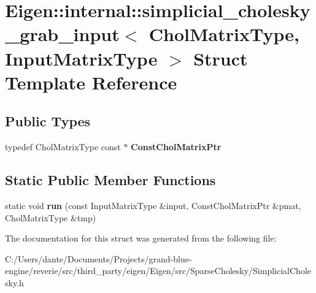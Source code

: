 \hypertarget{struct_eigen_1_1internal_1_1simplicial__cholesky__grab__input}{}\section{Eigen\+::internal\+::simplicial\+\_\+cholesky\+\_\+grab\+\_\+input$<$ Chol\+Matrix\+Type, Input\+Matrix\+Type $>$ Struct Template Reference}
\label{struct_eigen_1_1internal_1_1simplicial__cholesky__grab__input}
\subsection*{Public Types}
\begin{DoxyCompactItemize}
\item 
\mbox{\label{struct_eigen_1_1internal_1_1simplicial__cholesky__grab__input_aa40b82ddba001795c47760775a5ed4a5}} 
typedef Chol\+Matrix\+Type const  $\ast$ {\bfseries Const\+Chol\+Matrix\+Ptr}
\end{DoxyCompactItemize}
\subsection*{Static Public Member Functions}
\begin{DoxyCompactItemize}
\item 
\mbox{\label{struct_eigen_1_1internal_1_1simplicial__cholesky__grab__input_ad2473ac42c6e41b5eb5383be03740c05}} 
static void {\bfseries run} (const Input\+Matrix\+Type \&input, Const\+Chol\+Matrix\+Ptr \&pmat, Chol\+Matrix\+Type \&tmp)
\end{DoxyCompactItemize}


The documentation for this struct was generated from the following file\+:\begin{DoxyCompactItemize}
\item 
C\+:/\+Users/dante/\+Documents/\+Projects/grand-\/blue-\/engine/reverie/src/third\+\_\+party/eigen/\+Eigen/src/\+Sparse\+Cholesky/Simplicial\+Cholesky.\+h\end{DoxyCompactItemize}
